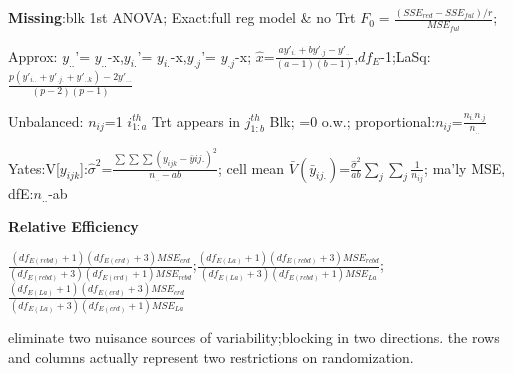 \documentclass[
  10pt,
  twocolumn]{article}
\begin{document}
\textbf{Missing}:blk 1st ANOVA; Exact:full reg model \& no Trt
\(F_0=\frac{(SSE_{red}-SSE_{ful})/r}{MSE_{ful}}\);

Approx: \(y_{..}\)'= \(y_{..}\)-x,\(y_{i.}\)'= \(y_{i.}\)-x,\(y_{.j}\)'=
\(y_{.j}\)-x;
\(\hat x\)=\(\frac{ay'_{i.}+by'_{.j}-y'_{..}}{(a-1)(b-1)}\),\(df_{E}\)-1;LaSq:\(\frac{p(y'_{i..}+y'_{.j.}+y'_{..k})-2y'_{...}}{(p-2)(p-1)}\)

\dotfill

Unbalanced: \(n_{ij}\)=1 \(i^{th}_{1:a}\) Trt appears in
\(j^{th}_{1:b}\) Blk; =0 o.w.;
proportional:\(n_{ij}\)=\(\frac{n_{i.}n_{.j}}{n_{..}}\)

Yates:V{[}\(y_{ijk}\){]}:\(\hat\sigma^2\)=\(\frac{\sum\sum\sum(y_{ijk}-\bar y{ij.})^2}{n_{..}-ab}\);
cell mean
\(\bar V(\bar y_{ij.})\)=\(\frac{\hat\sigma^2}{ab}\sum_j\sum_j\frac{1}{n_{ij}}\);
ma'ly MSE, dfE:\(n_{..}\)-ab

\textbf{Relative Efficiency}\dotfill

\(\frac{(df_{E(rcbd)}+1)(df_{E(crd)}+3)MSE_{crd}}{(df_{E(rcbd)}+3)(df_{E(crd)}+1)MSE_{rcbd}}\);\(\frac{(df_{E(La)}+1)(df_{E(rcbd)}+3)MSE_{rcbd}}{(df_{E(La)}+3)(df_{E(rcbd)}+1)MSE_{La}}\);\(\frac{(df_{E(La)}+1)(df_{E(crd)}+3)MSE_{crd}}{(df_{E(La)}+3)(df_{E(crd)}+1)MSE_{La}}\)

eliminate two nuisance sources of variability;blocking in two
directions. the rows and columns actually represent two restrictions on
randomization.
\end{document}
